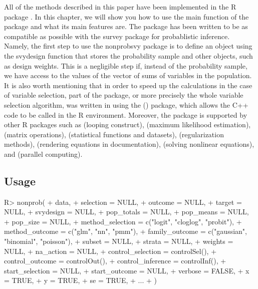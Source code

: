 \documentclass[
]{jss}
\begin{document}
All of the methods described in this paper have been implemented in the
R package  \cite{nonprobsvy}. In this chapter, we will
show you how to use the main  function of the package and
what its main features are. The package has been written to be as
compatible as possible with the survey package for probablistic
inference. Namely, the first step to use the nonprobsvy package is to
define an object using the svydesign function that stores the
probability sample  and other objects, such as design
weights. This is a negligible step if, instead of the probability
sample, we have access to the values of the vector of sums of variables
in the population. It is also worth mentioning that in order to speed up
the calculations in the case of variable selection, part of the package,
or more precisely the whole variable selection algorithm, was written in
 using the  (\cite{Rcpp}) package, which allows
the C++ code to be called in the R environment. Moreover, the package is
supported by other R packages such as  \cite{foreach}
(looping construct),  \cite{maxLik} (maximum likelihood
estimation),  \cite{Matrix} (matrix operations), 
\citet{MASS} (statistical functions and datasets), 
\cite{ncvreg} (regularization methods),  \cite{mathjaxr}
(rendering equations in documentation),  \cite{nleqslv}
(solving nonlinear equations), and  \cite{doParallel}
(parallel computing).

\subsection{Usage}\label{usage}

\begin{CodeChunk}
\begin{CodeInput}
R> nonprob(
+   data,
+   selection = NULL,
+   outcome = NULL,
+   target = NULL,
+   svydesign = NULL,
+   pop_totals = NULL,
+   pop_means = NULL,
+   pop_size = NULL,
+   method_selection = c("logit", "cloglog", "probit"),
+   method_outcome = c("glm", "nn", "pmm"),
+   family_outcome = c("gaussian", "binomial", "poisson"),
+   subset = NULL,
+   strata = NULL,
+   weights = NULL,
+   na_action = NULL,
+   control_selection = controlSel(),
+   control_outcome = controlOut(),
+   control_inference = controlInf(),
+   start_selection = NULL,
+   start_outcome = NULL,
+   verbose = FALSE,
+   x = TRUE,
+   y = TRUE,
+   se = TRUE,
+   ...
+ )
\end{CodeInput}
\end{CodeChunk}
\end{document}
